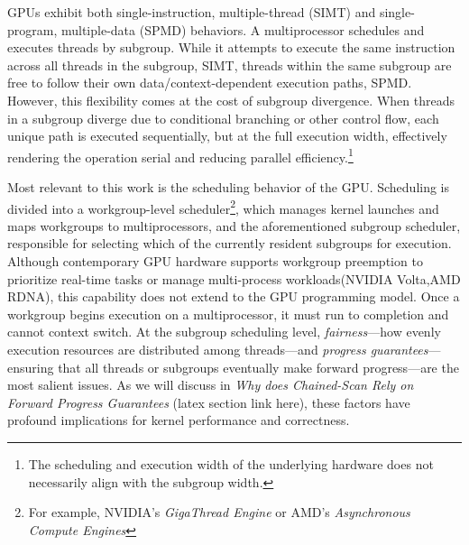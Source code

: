 \documentclass[sigconf]{acmart}
\begin{document}
 GPUs exhibit both single-instruction, multiple-thread (SIMT) and single-program, multiple-data (SPMD) behaviors. A multiprocessor schedules and executes threads by subgroup. While it attempts to execute the same instruction across all threads in the subgroup, SIMT, threads within the same subgroup are free to follow their own data/context-dependent execution paths, SPMD. However, this flexibility comes at the cost of subgroup divergence. When threads in a subgroup diverge due to conditional branching or other control flow, each unique path is executed sequentially, but at the full execution width, effectively rendering the operation serial and reducing parallel efficiency.\footnote{The scheduling and execution width of the underlying hardware does not necessarily align with the subgroup width.} 
 
 Most relevant to this work is the scheduling behavior of the GPU. Scheduling is divided into a workgroup-level scheduler\footnote{For example, NVIDIA's \emph{GigaThread Engine} or AMD's \emph{Asynchronous Compute Engines}}, which manages kernel launches and maps workgroups to multiprocessors, and the aforementioned subgroup scheduler, responsible for selecting which of the currently resident subgroups for execution. Although contemporary GPU hardware supports workgroup preemption to prioritize real-time tasks or manage multi-process workloads\cite{}(NVIDIA Volta,AMD RDNA), this capability does not extend to the GPU programming model. Once a workgroup begins execution on a multiprocessor, it must run to completion and cannot context switch. At the subgroup scheduling level, \emph{fairness}—how evenly execution resources are distributed among threads—and \emph{progress guarantees}—ensuring that all threads or subgroups eventually make forward progress—are the most salient issues. As we will discuss in \emph{Why does \emph{Chained-Scan} Rely on Forward Progress Guarantees} (latex section link here), these factors have profound implications for kernel performance and correctness.
\end{document}
